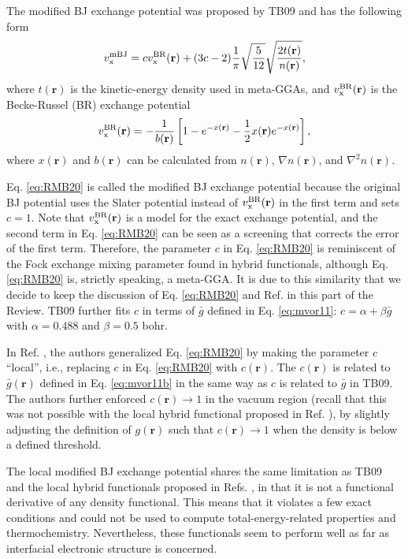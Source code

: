 \documentclass[aip, amsmath, amssymb, reprint, longbibliography]{revtex4-2}
\def\mr{\mathbf{r}}
\begin{document}
The modified BJ exchange potential was proposed by TB09 and has the following form\cite{TB09}
\begin{equation}
v_{\rm x}^{\rm mBJ} = cv_{\rm x}^{\rm BR}(\mr)+(3c-2)\frac{1}{\pi}\sqrt{\frac{5}{12}}\sqrt{\frac{2t(\mr)}{n(\mr)}},
\label{eq:RMB20}
\end{equation}
where $t(\mr)$ is the kinetic-energy density used in meta-GGAs, and $v_{\rm x}^{\rm BR}(\mr)$ is the Becke-Russel (BR) exchange potential \cite{BR89}
\begin{equation}
v_{\rm x}^{\rm BR}(\mr)=-\frac{1}{b(\mr)}\left[1-e^{-x(\mr)}-\frac{1}{2}x(\mr)e^{-x(\mr)}\right],
\label{eq:RMB20b}
\end{equation}
where $x(\mr)$ and $b(\mr)$ can be calculated from $n(\mr)$, $\nabla n(\mr)$, and $\nabla^2 n(\mr)$.

Eq. \eqref{eq:RMB20} is called the modified BJ exchange potential because the original BJ potential \cite{BJ06} uses the Slater potential \cite{S51} instead of $v_{\rm x}^{\rm BR}(\mr)$ in the first term and sets $c=1$. Note that $v_{\rm x}^{\rm BR}(\mr)$ is a model for the exact exchange potential, and the second term in Eq. \eqref{eq:RMB20} can be seen as a screening that corrects the error of the first term. Therefore, the parameter $c$ in Eq. \eqref{eq:RMB20} is reminiscent of the Fock exchange mixing parameter found in hybrid functionals, although Eq. \eqref{eq:RMB20} is, strictly speaking, a meta-GGA. It is due to this similarity that we decide to keep the discussion of Eq. \eqref{eq:RMB20} and Ref.  in this part of the Review. TB09 further fits $c$ in terms of $\bar{g}$ defined in Eq. \eqref{eq:mvor11}: $c=\alpha + \beta \bar{g}$ with $\alpha=0.488$ and $\beta=0.5$ bohr.

In Ref. , the authors generalized Eq. \eqref{eq:RMB20} by making the parameter $c$ ``local'', i.e., replacing $c$ in Eq. \eqref{eq:RMB20} with $c(\mr)$. The $c(\mr)$ is related to $\bar{g}(\mr)$ defined in Eq. \eqref{eq:mvor11b} in the same way as $c$ is related to $\bar{g}$ in TB09. The authors further enforced $c(\mr) \to 1$ in the vacuum region (recall that this was not possible with the local hybrid functional proposed in Ref. ), by slightly adjusting the definition of $g(\mr)$ such that $c(\mr) \to 1$ when the density is below a defined threshold.

The local modified BJ exchange potential shares the same limitation as TB09 and the local hybrid functionals proposed in Refs. , in that it is not a functional derivative of any density functional. This means that it violates a few exact conditions and could not be used to compute total-energy-related properties and thermochemistry. Nevertheless, these functionals seem to perform well as far as interfacial electronic structure is concerned. 
\end{document}
